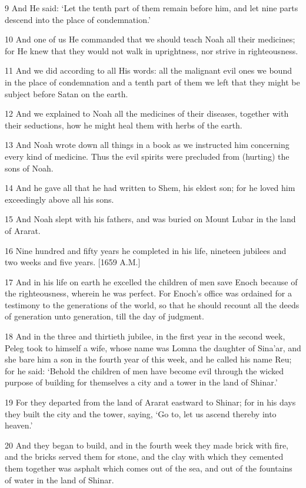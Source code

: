 \par 9 And He said: ‘Let the tenth part of them remain before him, and let nine parts descend into the place of condemnation.’
\par 10 And one of us He commanded that we should teach Noah all their medicines; for He knew that they would not walk in uprightness, nor strive in righteousness.
\par 11 And we did according to all His words: all the malignant evil ones we bound in the place of condemnation and a tenth part of them we left that they might be subject before Satan on the earth.
\par 12 And we explained to Noah all the medicines of their diseases, together with their seductions, how he might heal them with herbs of the earth.
\par 13 And Noah wrote down all things in a book as we instructed him concerning every kind of medicine. Thus the evil spirits were precluded from (hurting) the sons of Noah.
\par 14 And he gave all that he had written to Shem, his eldest son; for he loved him exceedingly above all his sons.
\par 15 And Noah slept with his fathers, and was buried on Mount Lubar in the land of Ararat.
\par 16 Nine hundred and fifty years he completed in his life, nineteen jubilees and two weeks and five years. [1659 A.M.]
\par 17 And in his life on earth he excelled the children of men save Enoch because of the righteousness, wherein he was perfect. For Enoch's office was ordained for a testimony to the generations of the world, so that he should recount all the deeds of generation unto generation, till the day of judgment.
\par 18 And in the three and thirtieth jubilee, in the first year in the second week, Peleg took to himself a wife, whose name was Lomna the daughter of Sina'ar, and she bare him a son in the fourth year of this week, and he called his name Reu; for he said: ‘Behold the children of men have become evil through the wicked purpose of building for themselves a city and a tower in the land of Shinar.’
\par 19 For they departed from the land of Ararat eastward to Shinar; for in his days they built the city and the tower, saying, ‘Go to, let us ascend thereby into heaven.’
\par 20 And they began to build, and in the fourth week they made brick with fire, and the bricks served them for stone, and the clay with which they cemented them together was asphalt which comes out of the sea, and out of the fountains of water in the land of Shinar.

